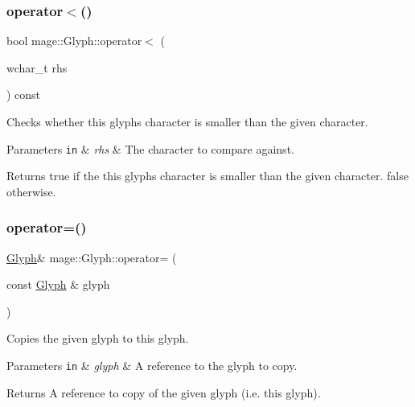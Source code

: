 \subsubsection{\texorpdfstring{operator$<$()}{operator<()}\hspace{0.1cm}{\footnotesize\ttfamily [2/2]}}
{\footnotesize\ttfamily bool mage\+::\+Glyph\+::operator$<$ (\begin{DoxyParamCaption}\item[{wchar\+\_\+t}]{rhs }\end{DoxyParamCaption}) const\hspace{0.3cm}{\ttfamily [noexcept]}}

Checks whether this glyph\textquotesingle{}s character is smaller than the given character.


\begin{DoxyParams}[1]{Parameters}
\mbox{\tt in}  & {\em rhs} & The character to compare against. \\
\hline
\end{DoxyParams}
\begin{DoxyReturn}{Returns}
{\ttfamily true} if the this glyph\textquotesingle{}s character is smaller than the given character. {\ttfamily false} otherwise. 
\end{DoxyReturn}
\hypertarget{structmage_1_1_glyph_ae9ea2dff58ce0765d7746af93d97c338}{}\label{structmage_1_1_glyph_ae9ea2dff58ce0765d7746af93d97c338} 
\subsubsection{\texorpdfstring{operator=()}{operator=()}\hspace{0.1cm}{\footnotesize\ttfamily [1/2]}}
{\footnotesize\ttfamily \hyperlink{structmage_1_1_glyph}{Glyph}\& mage\+::\+Glyph\+::operator= (\begin{DoxyParamCaption}\item[{const \hyperlink{structmage_1_1_glyph}{Glyph} \&}]{glyph }\end{DoxyParamCaption})\hspace{0.3cm}{\ttfamily [default]}}

Copies the given glyph to this glyph.


\begin{DoxyParams}[1]{Parameters}
\mbox{\tt in}  & {\em glyph} & A reference to the glyph to copy. \\
\hline
\end{DoxyParams}
\begin{DoxyReturn}{Returns}
A reference to copy of the given glyph (i.\+e. this glyph). 
\end{DoxyReturn}
\hypertarget{structmage_1_1_glyph_a28a3279f2e142e4b771295d64d7cb414}{}\label{structmage_1_1_glyph_a28a3279f2e142e4b771295d64d7cb414} 
